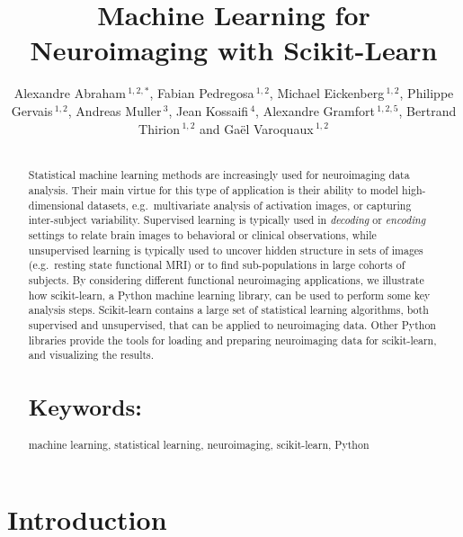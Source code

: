 \documentclass{frontiersSCNS} %
\def\firstAuthorLast{Alexandre Abraham {et~al}} %
\def\Authors{
    Alexandre Abraham\,$^{1,2,*}$,
    Fabian Pedregosa\,$^{1,2}$,
    Michael Eickenberg\,$^{1,2}$,
    Philippe Gervais\,$^{1,2}$,
    Andreas Muller\,$^{3}$,
    Jean Kossaifi\,$^{4}$,
    Alexandre Gramfort\,$^{1,2,5}$,
    Bertrand Thirion\,$^{1,2}$
    and Ga\"el Varoquaux\,$^{1,2}$}
\begin{document}
\onecolumn
{}

\title[Machine Learning for Neuroimaging with Scikit-Learn]{Machine Learning for Neuroimaging with Scikit-Learn}
\author[\firstAuthorLast ]{\Authors}
\address{}
\correspondance{}
\editor{}

\maketitle
\begin{abstract}

\section{}
Statistical machine learning methods are increasingly used for
neuroimaging data analysis. Their main virtue for this type of application
is their ability to model high-dimensional datasets, e.g.\ multivariate
analysis of activation images, or capturing inter-subject variability.
Supervised learning is typically used in \emph{decoding} or
\emph{encoding} settings to relate
brain images to behavioral or clinical observations, while
unsupervised learning is typically used to uncover hidden structure in
sets of images (e.g.\ resting state functional MRI) or to find
sub-populations in large cohorts of subjects. By considering
different functional neuroimaging applications, we illustrate how scikit-learn,
a Python machine learning library, can be used to perform some key
analysis steps. Scikit-learn contains a large set of statistical
learning algorithms, both supervised and unsupervised, that can be applied
to neuroimaging data. Other Python libraries provide the tools for
loading and preparing neuroimaging data for scikit-learn, and visualizing
the results.


\tiny
\section{Keywords:} machine learning, statistical learning, neuroimaging,
scikit-learn, Python
\end{abstract}


\section{Introduction}
\end{document}

